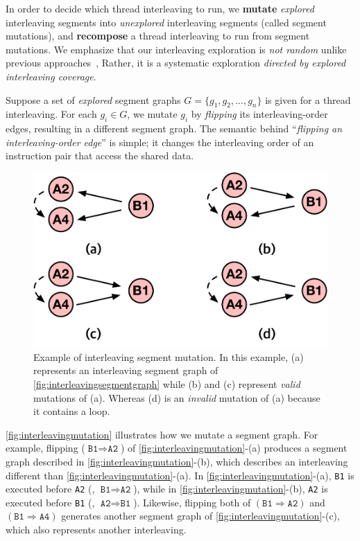 In order to decide which thread interleaving to run, we
\textbf{mutate} \textit{explored} interleaving segments into
\textit{unexplored} interleaving segments (called segment mutations),
and \textbf{recompose} a thread interleaving to run from segment
mutations.
%
We emphasize that our interleaving exploration is \textit{not random}
unlike previous approaches~\cite{krace, ski, pctalgorithm, muzz},
Rather, it is a systematic exploration \textit{directed by explored
  interleaving coverage}.
%


%
Suppose a set of \textit{explored} segment graphs
$G = \{g_1, g_2, ..., g_n \}$ is given for a thread interleaving.
%
For each $g_i \in G$, we mutate $g_i$ by \textit{flipping} its
interleaving-order edges, resulting in a different segment graph.
%
The semantic behind ``\textit{flipping an interleaving-order edge}''
is simple; it changes the interleaving order of an instruction pair
that access the shared data.




\begin{figure}[t]
  \centering
  \includegraphics[width=0.7\linewidth]{fig/interleavingmutation.pdf}
  \caption{Example of interleaving segment mutation. In this example,
    (a) represents an interleaving segment graph of
    \autoref{fig:interleavingsegmentgraph} while (b) and (c) represent
    \textit{valid} mutations of (a). Whereas (d) is an
    \textit{invalid} mutation of (a) because it contains a loop.}
  \label{fig:interleavingmutation}
\end{figure}
%
\autoref{fig:interleavingmutation} illustrates how we mutate a segment
graph.
%
For example, flipping ($\texttt{B1} \Rightarrow \texttt{A2}$) of
\autoref{fig:interleavingmutation}-(a) produces a segment graph
described in \autoref{fig:interleavingmutation}-(b), which describes
an interleaving different than \autoref{fig:interleavingmutation}-(a).
%
In \autoref{fig:interleavingmutation}-(a), \texttt{B1} is executed
before \texttt{A2} (\ie, $\texttt{B1} \Rightarrow \texttt{A2}$), while
in \autoref{fig:interleavingmutation}-(b), \texttt{A2} is executed
before \texttt{B1} (\ie, $\texttt{A2} \Rightarrow \texttt{B1}$).
%
Likewise, flipping both of $(\texttt{B1} \Rightarrow \texttt{A2})$ and
$(\texttt{B1} \Rightarrow \texttt{A4})$ generates another segment
graph of \autoref{fig:interleavingmutation}-(c), which also represents
another interleaving.

